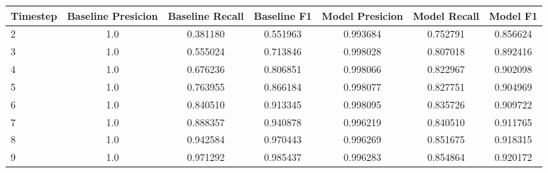\begin{tabular}{lcccccc}
\toprule
 Timestep &  Baseline Presicion &  Baseline Recall &  Baseline F1 &  Model Presicion &  Model Recall &  Model F1 \\
\midrule
        2 &                 1.0 &         0.381180 &     0.551963 &         0.993684 &      0.752791 &  0.856624 \\
        3 &                 1.0 &         0.555024 &     0.713846 &         0.998028 &      0.807018 &  0.892416 \\
        4 &                 1.0 &         0.676236 &     0.806851 &         0.998066 &      0.822967 &  0.902098 \\
        5 &                 1.0 &         0.763955 &     0.866184 &         0.998077 &      0.827751 &  0.904969 \\
        6 &                 1.0 &         0.840510 &     0.913345 &         0.998095 &      0.835726 &  0.909722 \\
        7 &                 1.0 &         0.888357 &     0.940878 &         0.996219 &      0.840510 &  0.911765 \\
        8 &                 1.0 &         0.942584 &     0.970443 &         0.996269 &      0.851675 &  0.918315 \\
        9 &                 1.0 &         0.971292 &     0.985437 &         0.996283 &      0.854864 &  0.920172 \\
\bottomrule
\end{tabular}
